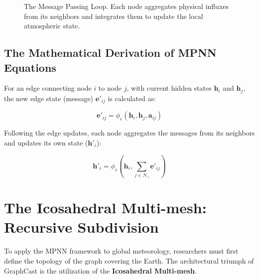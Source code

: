 \begin{figure}[H]
\centering
{}
\caption{The Message Passing Loop. Each node aggregates physical influxes from its neighbors and integrates them to update the local atmospheric state.}
\label{fig:mpnn_tikz}
\end{figure}

\subsection{The Mathematical Derivation of MPNN Equations}
For an edge connecting node $i$ to node $j$, with current hidden states $\mathbf{h}_i$ and $\mathbf{h}_j$, the new edge state (message) $\mathbf{e}'_{ij}$ is calculated as:

\begin{equation}
\mathbf{e}'_{ij} = \phi_e(\mathbf{h}_i, \mathbf{h}_j, \mathbf{a}_{ij})
\end{equation}

Following the edge updates, each node aggregates the messages from its neighbors and updates its own state ($\mathbf{h}'_i$):

\begin{equation}
\mathbf{h}'_i = \phi_v(\mathbf{h}_i, \sum_{j \in \mathcal{N}_i} \mathbf{e}'_{ij})
\end{equation}

\section{The Icosahedral Multi-mesh: Recursive Subdivision}

To apply the MPNN framework to global meteorology, researchers must first define the topology of the graph covering the Earth. The architectural triumph of GraphCast is the utilization of the \textbf{Icosahedral Multi-mesh}.

